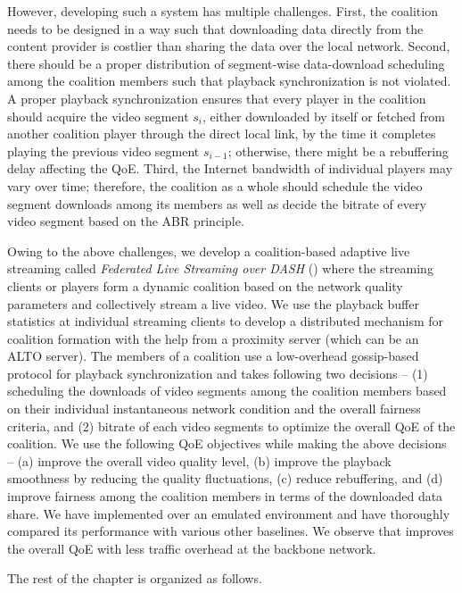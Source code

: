 However, developing such a system has multiple challenges. First, the coalition needs to be designed in a way such that downloading data directly from the content provider is costlier than sharing the data over the local network. Second, there should be a proper distribution of segment-wise data-download scheduling among the coalition members such that playback synchronization is not violated. A proper playback synchronization ensures that every player in the coalition should acquire the video segment $s_{i}$, either downloaded by itself or fetched from another coalition player through the direct local link, by the time it completes playing the previous video segment $s_{i-1}$; otherwise, there might be a rebuffering delay affecting the \ac{QoE}. Third, the Internet bandwidth of individual players may vary over time; therefore, the coalition as a whole should schedule the video segment downloads among its members as well as decide the bitrate of every video segment based on the \ac{ABR} principle.

Owing to the above challenges, we develop a coalition-based adaptive live streaming  called \textit{Federated Live Streaming over \ac{DASH}} (\our) where the streaming clients or players form a dynamic coalition based on the network quality parameters and collectively stream a live video. We use the playback buffer statistics at individual streaming clients to develop a distributed mechanism for coalition formation with the help from a proximity server (which can be an \ac{ALTO} server). The members of a coalition use a low-overhead gossip-based protocol for playback synchronization and takes following two decisions -- (1) scheduling the downloads of video segments among the coalition members based on their individual instantaneous network condition and the overall fairness criteria, and (2) bitrate of each video segments to optimize the overall \ac{QoE} of the coalition. We use the following \ac{QoE} objectives while making the above decisions -- (a) improve the overall video quality level, (b) improve the playback smoothness by reducing the quality fluctuations, (c) reduce rebuffering, and (d) improve fairness  among the coalition members in terms of the downloaded data share. We have implemented {\our} over an emulated environment and have thoroughly compared its performance with various other baselines. We observe that {\our} improves the overall \ac{QoE} with less traffic overhead at the backbone network.

The rest of the chapter is organized as follows. 

